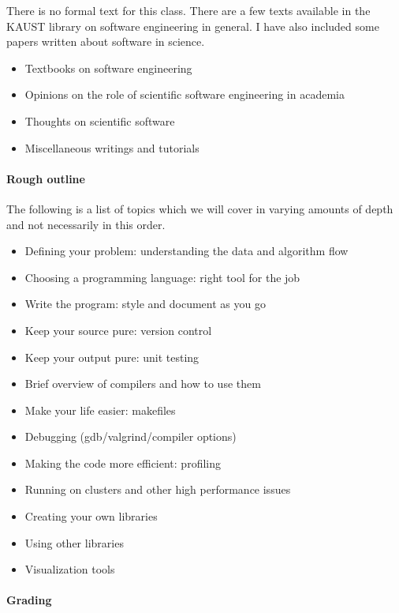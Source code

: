 \documentclass[12 pt]{article}
\begin{document}
There is no formal text for this class. There are a few texts
available in the KAUST library on software engineering in general. I
have also included some papers written about software in science.

\begin{itemize}
\item Textbooks on software engineering \cite{Sommerville2011,Nanz2011}
\item Opinions on the role of scientific software engineering in academia \cite{Todorov2012,Dirk2012}
\item Thoughts on scientific software \cite{Katzgraber2010,Hannay2009,Smith2007,Barnes2010}
\item Miscellaneous writings and tutorials \cite{make,Prentice1998,Gube2011,Spolsky2012}
\end{itemize}

\paragraph{Rough outline}

The following is a list of topics which we will cover in varying
amounts of depth and not necessarily in this order.
\begin{itemize}
\item Defining your problem: understanding the data and algorithm flow
\item Choosing a programming language: right tool for the job
\item Write the program: style and document as you go
\item Keep your source pure: version control
\item Keep your output pure: unit testing
\item Brief overview of compilers and how to use them
\item Make your life easier: makefiles
\item Debugging (gdb/valgrind/compiler options)
\item Making the code more efficient: profiling
\item Running on clusters and other high performance issues
\item Creating your own libraries
\item Using other libraries
\item Visualization tools
\end{itemize}

\paragraph{Grading}
\end{document}
